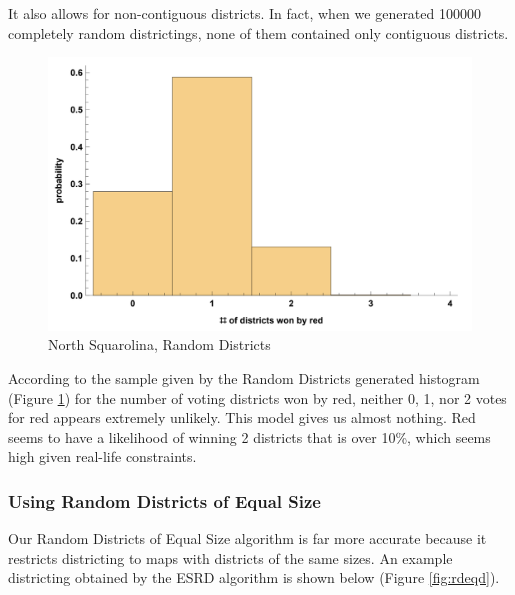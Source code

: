 \documentclass[12pt]{article}
\begin{document}
It also allows for non-contiguous districts. In fact, when we generated 100000 completely random districtings, none of them contained only contiguous districts.
    \begin{figure}[h!]
    \centering
    \includegraphics[scale=0.45]{random}
    \caption{North Squarolina, Random Districts}
    \label{fig:ns_rd}
    \end{figure}
    
According to the sample given by the Random Districts generated histogram (Figure \ref{fig:ns_rd}) for the number of voting districts won by red, neither 0, 1, nor 2 votes for red appears extremely unlikely. This model gives us almost nothing. Red seems to have a likelihood of winning 2 districts that is over 10\%, which seems high given real-life constraints.

\subsubsection{Using Random Districts of Equal Size}
Our Random Districts of Equal Size algorithm is far more accurate because it restricts districting to maps with districts of the same sizes. An example districting obtained by the ESRD algorithm is shown below (Figure \ref{fig:rdeqd}).
\end{document}
